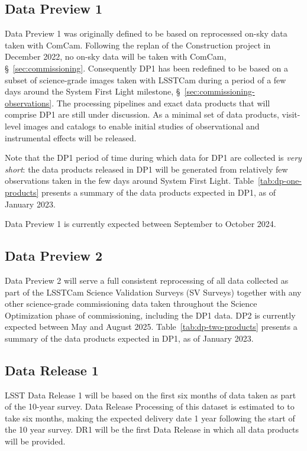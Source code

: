 \subsection{Data Preview 1}

Data Preview 1 was originally defined to be based on reprocessed on-sky data taken with ComCam.
Following the replan of the Construction project in December 2022, no on-sky data will be taken with ComCam, \S~\ref{sec:commissioning}.
Consequently DP1 has been redefined to be based on a subset of science-grade images taken with LSSTCam during a period of a few days around the System First Light milestone, \S~\ref{sec:commissioning-observations}.
The processing pipelines and exact data products that will comprise DP1 are still under discussion. 
As a minimal set of data products, visit-level images and catalogs to enable initial studies of observational and instrumental effects will be released. 

Note that the DP1 period of time during which data for DP1 are collected is \textit{very short}: the data products released in DP1 will be generated from relatively few observations taken in the few days around System First Light.
Table~\ref{tab:dp-one-products} presents a summary of the data products expected in DP1, as of January 2023.

Data Preview 1 is currently expected between September to October 2024. 

\subsection{Data Preview 2}

Data Preview 2 will serve a full consistent reprocessing of all data collected as part of the LSSTCam Science Validation Surveys (SV Surveys) together with any other science-grade commissioning data taken throughout the Science Optimization phase of commissioning, including the DP1 data. 
DP2 is currently expected between May and August 2025. 
Table~\ref{tab:dp-two-products} presents a summary of the data products expected in DP1, as of January 2023.

\subsection{Data Release 1}

LSST Data Release 1 will be based on the first six months of data taken as part of the 10-year survey. 
Data Release Processing of this dataset is estimated to to take six months, making the expected delivery date 1 year following the start of the 10 year survey. 
DR1 will be the first Data Release in which all data products will be provided. 

